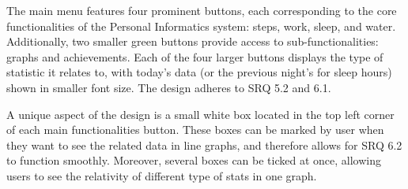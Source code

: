 \documentclass[11pt]{article}
\begin{document}
The main menu features four prominent buttons, each corresponding to the core 
functionalities of the Personal Informatics system: steps, work, sleep, and water.
Additionally, two smaller green buttons provide access to sub-functionalities:
graphs and achievements. Each of the four larger buttons displays 
the type of statistic it relates to, with today's data (or the previous night's
for sleep hours) shown in smaller font size. The design adheres to SRQ 5.2 and 6.1.\par

A unique aspect of the design is a small white box located in the top left
corner of each main functionalities button. These boxes can be marked by user when they want to see
the related data in line graphs, and therefore allows for SRQ 6.2 to function smoothly.
Moreover, several boxes can be ticked at once, allowing users to see the relativity of different type of stats in one graph.\par
\end{document}
